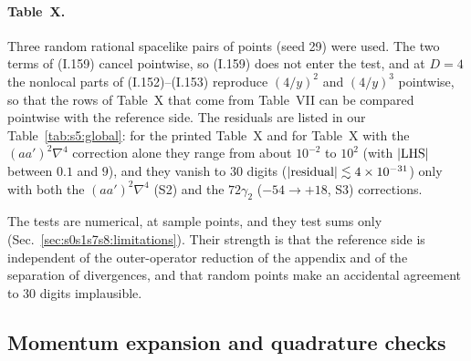 \documentclass[aps,prd,onecolumn,10pt,nofootinbib,floatfix]{revtex4-2}
\newcommand{\eqI}[1]{(I.#1)}
\begin{document}
\paragraph*{Table~X.} Three random rational spacelike pairs of points (seed 29) were used. The two terms of \eqI{159} cancel
pointwise, so \eqI{159} does not enter the test, and at $D=4$ the nonlocal parts of \eqI{152}--\eqI{153} reproduce $(4/y)^2$ and
$(4/y)^3$ pointwise, so that the rows of Table~X that come from Table~VII can be compared pointwise with the reference side. The
residuals are listed in our Table~\ref{tab:s5:global}: for the printed Table~X and for Table~X with the $(aa')^2\nabla^4$ correction
alone they range from about $10^{-2}$ to $10^2$ (with $|{\rm LHS}|$ between $0.1$ and $9$), and they vanish to 30 digits ($|{\rm residual}|\lesssim4\times10^{-31}$) only with both the
$(aa')^2\nabla^4$ (S2) and the $72\gamma_2$ ($-54\to+18$, S3) corrections.

The tests are numerical, at sample points, and they test sums only (Sec.~\ref{sec:s0s1s7s8:limitations}). Their strength is that the
reference side is independent of the outer-operator reduction of the appendix and of the separation of divergences, and that random
points make an accidental agreement to 30 digits implausible.

\subsection{Momentum expansion and quadrature checks}
\label{app:s0s1s7s8:kexp}
\end{document}
